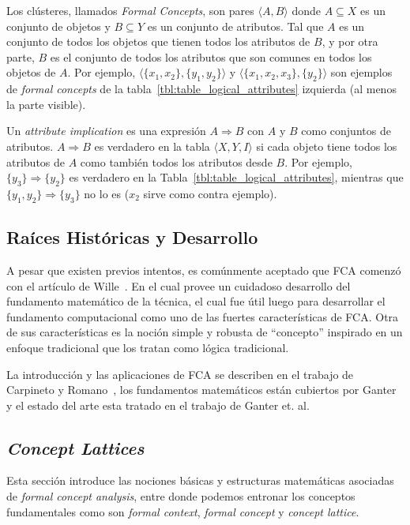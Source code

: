 \documentclass[12pt,oneside,letterpaper]{book}
\newcommand{\eng}[1]{\textit{#1}\xspace}			%
\newcommand{\abr}[1]{\textsc{#1}\xspace}           %
\theoremstyle{definition}
\begin{document}
Los clústeres, llamados \eng{Formal Concepts}, son pares $\langle A,B \rangle$ donde $A \subseteq X$ es un conjunto de objetos y $B \subseteq Y$ es un conjunto de atributos. Tal que $A$ es un conjunto de todos los objetos que tienen todos los atributos de $B$, y por otra parte, $B$ es el conjunto de todos los atributos que son comunes en todos los objetos de $A$. Por ejemplo, $\langle \{x_1, x_2\}, \{y_1, y_2\} \rangle$ y $\langle \{x_1, x_2, x_3\}, \{y_2\} \rangle$ son ejemplos de \eng{formal concepts} de la tabla~\ref{tbl:table_logical_attributes} izquierda (al menos la parte visible).

Un \eng{attribute implication} es una expresión $A \Rightarrow B$ con $A$ y $B$  como conjuntos de atributos. $A \Rightarrow B$ es verdadero en la tabla $\langle X,Y,I \rangle$ si cada objeto tiene todos los atributos de $A$ como también todos los atributos desde $B$. Por ejemplo, $\{y_3\} \Rightarrow \{y_2\}$ es verdadero en la Tabla~\ref{tbl:table_logical_attributes}, mientras que $\{y_1,y_2\} \Rightarrow \{y_3\}$ no lo es ($x_2$ sirve como contra ejemplo).

\subsection{Raíces Históricas y Desarrollo} %
\label{sub:ra_ces_historicas_y_desarrollo}
A pesar que existen previos intentos, es comúnmente aceptado que \abr{FCA} comenzó con el artículo de Wille~\cite{wille1982}. En el cual provee un cuidadoso desarrollo del fundamento matemático de la técnica, el cual fue útil luego para desarrollar el fundamento computacional como uno de las fuertes características de \abr{FCA}. Otra de sus características es la noción simple y robusta de ``concepto'' inspirado en un enfoque tradicional que los tratan como lógica tradicional. 

La introducción y las aplicaciones de \abr{FCA} se describen en el trabajo de Carpineto y Romano~\cite{carpineto2004}, los fundamentos matemáticos están cubiertos por Ganter~\cite{Ganter1997} y el estado del arte esta tratado en el trabajo de Ganter et. al.~\cite{Ganter2005}

\subsection{\eng{Concept Lattices}}
\label{sub:concept_lattices}
Esta sección introduce las nociones básicas y estructuras matemáticas asociadas de \eng{formal concept analysis}, entre donde podemos entronar los conceptos fundamentales como son \eng{formal context}, \eng{formal concept} y \eng{concept lattice}.
\end{document}
